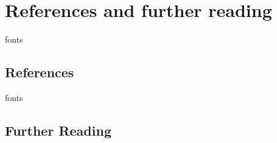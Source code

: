 \documentclass[12pt, a4paper, twocolumn, twoside]{article}
\numberwithin{table}{section}
\numberwithin{figure}{section}
\numberwithin{equation}{section}
\begin{document}
\section{References and further reading}
\begin{btSect}{fonts}
	
	\subsection*{References}	
	\btPrintCited
\end{btSect}

\begin{btSect}{fonts}
	
	\subsection*{Further Reading}	
	\btPrintNotCited
\end{btSect}
\end{document}
